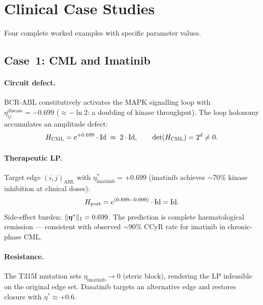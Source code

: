 \section{Clinical Case Studies}
\label{sec:ch09-cases}

Four complete worked examples with specific parameter values.

\subsection{Case~1: CML and Imatinib}
\label{subsec:ch09-cml}

\paragraph{Circuit defect.}
BCR-ABL constitutively activates the MAPK signalling loop with
$\eta_{ij}^{\mathrm{disease}} = -0.699$ ($\approx -\ln 2$: a doubling of
kinase throughput). The loop holonomy accumulates an amplitude defect:
\begin{equation}
  H_{\mathrm{CML}} = e^{+0.699}\cdot\mathrm{Id} \;\approx\; 2\cdot\mathrm{Id},
  \qquad \det(H_{\mathrm{CML}}) = 2^d \neq 0.
  \label{eq:ch09-cml-holonomy}
\end{equation}

\paragraph{Therapeutic LP.}
Target edge $(i,j)_{\mathrm{ABL}}$ with $\eta^*_{\mathrm{imatinib}} = +0.699$
(imatinib achieves $\sim 70\%$ kinase inhibition at clinical doses):
\begin{equation}
  H_{\mathrm{post}} = e^{(0.699 - 0.699)}\cdot\mathrm{Id} = \mathrm{Id}.
  \label{eq:ch09-cml-restored}
\end{equation}
Side-effect burden: $\|\boldsymbol{\eta}^*\|_1 = 0.699$.  The prediction is complete
haematological remission — consistent with observed $\sim 90\%$ CCyR rate for
imatinib in chronic-phase CML.

\paragraph{Resistance.}
The T315I mutation sets $\eta_{\mathrm{imatinib}} \to 0$ (steric block),
rendering the LP infeasible on the original edge set.  Dasatinib targets an
alternative edge and restores closure with $\eta^* \approx +0.6$.

